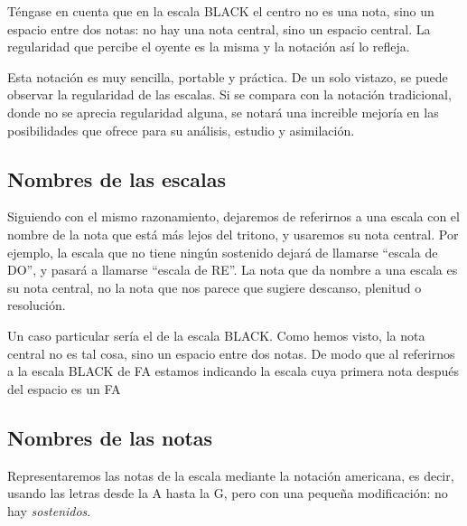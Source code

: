 \documentclass[]{report}
\begin{document}
Téngase en cuenta que en la escala \textsf{BLACK} el centro no es una nota, sino
un espacio entre dos notas: no hay una nota central, sino un espacio central. La
regularidad que percibe el oyente es la misma y la notación así lo refleja.

Esta notación es muy sencilla, portable y práctica. De un solo vistazo, se puede
observar la regularidad de las escalas. Si se compara con la notación
tradicional, donde no se aprecia regularidad alguna, se notará una increible
mejoría en las posibilidades que ofrece para su análisis, estudio y asimilación.

\subsection{Nombres de las escalas}
Siguiendo con el mismo razonamiento, dejaremos de referirnos a una escala con el nombre de la nota que está más lejos del tritono, y usaremos su nota central. Por ejemplo, la escala que no tiene ningún sostenido dejará de llamarse ``escala de DO'', y pasará a llamarse ``escala de RE''. La nota que da nombre a una escala es su nota central, no la nota que nos parece que sugiere descanso, plenitud o resolución.

Un caso particular sería el de la escala \textsf{BLACK}. Como hemos visto, la nota central no es tal cosa, sino un espacio entre dos notas. De modo que al referirnos a la escala \textsf{BLACK} de FA estamos indicando la escala cuya primera nota después del espacio es un FA

\subsection{Nombres de las notas}

Representaremos las notas de la escala mediante la notación americana, es decir, usando las letras desde la A hasta la G, pero con una pequeña modificación: no hay \emph{sostenidos}.

\begin{table}[htbp]
	\centering
	\caption{Equivalencias de las notas}\label{tab:note-equivalences}
\end{table}
\end{document}
